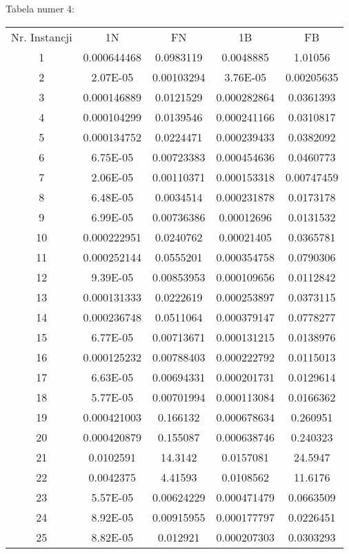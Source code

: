\documentclass{article}
\begin{document}
Tabela numer 4:
\begin{table}[h!]
\centering
\begin{tabular}{c||c|c|c|c}
Nr. Instancji & 1N & FN & 1B & FB \\
1 & 0.000644468 & 0.0983119 & 0.0048885 & 1.01056 \\
2 & 2.07E-05 & 0.00103294 & 3.76E-05 & 0.00205635 \\
3 & 0.000146889 & 0.0121529 & 0.000282864 & 0.0361393 \\
4 & 0.000104299 & 0.0139546 & 0.000241166 & 0.0310817 \\
5 & 0.000134752 & 0.0224471 & 0.000239433 & 0.0382092 \\
6 & 6.75E-05 & 0.00723383 & 0.000454636 & 0.0460773 \\
7 & 2.06E-05 & 0.00110371 & 0.000153318 & 0.00747459 \\
8 & 6.48E-05 & 0.0034514 & 0.000231878 & 0.0173178 \\
9 & 6.99E-05 & 0.00736386 & 0.00012696 & 0.0131532 \\
10 & 0.000222951 & 0.0240762 & 0.00021405 & 0.0365781 \\
11 & 0.000252144 & 0.0555201 & 0.000354758 & 0.0790306 \\
12 & 9.39E-05 & 0.00853953 & 0.000109656 & 0.0112842 \\
13 & 0.000131333 & 0.0222619 & 0.000253897 & 0.0373115 \\
14 & 0.000236748 & 0.0511064 & 0.000379147 & 0.0778277 \\
15 & 6.77E-05 & 0.00713671 & 0.000131215 & 0.0138976 \\
16 & 0.000125232 & 0.00788403 & 0.000222792 & 0.0115013 \\
17 & 6.63E-05 & 0.00694331 & 0.000201731 & 0.0129614 \\
18 & 5.77E-05 & 0.00701994 & 0.000113084 & 0.0166362 \\
19 & 0.000421003 & 0.166132 & 0.000678634 & 0.260951 \\
20 & 0.000420879 & 0.155087 & 0.000638746 & 0.240323 \\
21 & 0.0102591 & 14.3142 & 0.0157081 & 24.5947 \\
22 & 0.0042375 & 4.41593 & 0.0108562 & 11.6176 \\
23 & 5.57E-05 & 0.00624229 & 0.000471479 & 0.0663509 \\
24 & 8.92E-05 & 0.00915955 & 0.000177797 & 0.0226451 \\
25 & 8.82E-05 & 0.012921 & 0.000207303 & 0.0303293 \\

\end{tabular}
\end{table}
\end{document}
